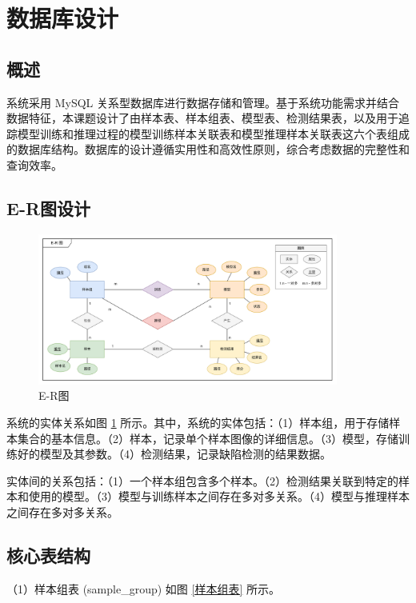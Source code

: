 \documentclass[
  ]{njuthesis}
\begin{document}
\section{数据库设计}

\subsection{概述}

系统采用 MySQL 关系型数据库进行数据存储和管理。基于系统功能需求并结合数据特征，本课题设计了由样本表、样本组表、模型表、检测结果表，以及用于追踪模型训练和推理过程的模型训练样本关联表和模型推理样本关联表这六个表组成的数据库结构。数据库的设计遵循实用性和高效性原则，综合考虑数据的完整性和查询效率。

\subsection{E-R图设计}

\begin{figure}[H]
    \centering
    \includegraphics[width=0.88\textwidth]{images/E-R图.png}
    \caption{E-R图}
    \label{E-R图}
\end{figure}

系统的实体关系如图 \ref{E-R图} 所示。其中，系统的实体包括：（1）样本组，用于存储样本集合的基本信息。（2）样本，记录单个样本图像的详细信息。（3）模型，存储训练好的模型及其参数。（4）检测结果，记录缺陷检测的结果数据。

实体间的关系包括：（1）一个样本组包含多个样本。（2）检测结果关联到特定的样本和使用的模型。（3）模型与训练样本之间存在多对多关系。（4）模型与推理样本之间存在多对多关系。

\subsection{核心表结构}

（1）样本组表 (sample\_group) 如图 \ref{样本组表} 所示。
\end{document}
